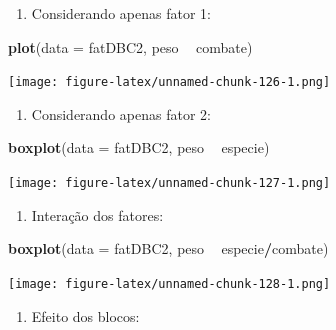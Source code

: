 \documentclass[
]{article}
\newenvironment{Shaded}{\begin{snugshade}}{\end{snugshade}}
\newcommand{\DataTypeTok}[1]{\textcolor[rgb]{0.13,0.29,0.53}{#1}}
\newcommand{\KeywordTok}[1]{\textcolor[rgb]{0.13,0.29,0.53}{\textbf{#1}}}
\newcommand{\NormalTok}[1]{#1}
\newcommand{\OperatorTok}[1]{\textcolor[rgb]{0.81,0.36,0.00}{\textbf{#1}}}
\newcommand{\StringTok}[1]{\textcolor[rgb]{0.31,0.60,0.02}{#1}}
\providecommand{\tightlist}{%
  \setlength{\itemsep}{0pt}\setlength{\parskip}{0pt}}
\begin{document}
\begin{enumerate}
\def\labelenumi{\arabic{enumi}.}
\tightlist
\item
  Considerando apenas fator 1:
\end{enumerate}

\begin{Shaded}
\begin{Highlighting}[]
\KeywordTok{plot}\NormalTok{(}\DataTypeTok{data =}\NormalTok{ fatDBC2, peso }\OperatorTok{~}\StringTok{ }\NormalTok{combate)}
\end{Highlighting}
\end{Shaded}

\texttt{[image: figure-latex/unnamed-chunk-126-1.png]}

\begin{enumerate}
\def\labelenumi{\arabic{enumi}.}
\setcounter{enumi}{1}
\tightlist
\item
  Considerando apenas fator 2:
\end{enumerate}

\begin{Shaded}
\begin{Highlighting}[]
\KeywordTok{boxplot}\NormalTok{(}\DataTypeTok{data =}\NormalTok{ fatDBC2, peso }\OperatorTok{~}\StringTok{ }\NormalTok{especie)}
\end{Highlighting}
\end{Shaded}

\texttt{[image: figure-latex/unnamed-chunk-127-1.png]}

\begin{enumerate}
\def\labelenumi{\arabic{enumi}.}
\setcounter{enumi}{2}
\tightlist
\item
  Interação dos fatores:
\end{enumerate}

\begin{Shaded}
\begin{Highlighting}[]
\KeywordTok{boxplot}\NormalTok{(}\DataTypeTok{data =}\NormalTok{ fatDBC2, peso }\OperatorTok{~}\StringTok{ }\NormalTok{especie}\OperatorTok{/}\NormalTok{combate)}
\end{Highlighting}
\end{Shaded}

\texttt{[image: figure-latex/unnamed-chunk-128-1.png]}

\begin{enumerate}
\def\labelenumi{\arabic{enumi}.}
\setcounter{enumi}{3}
\tightlist
\item
  Efeito dos blocos:
\end{enumerate}
\end{document}
